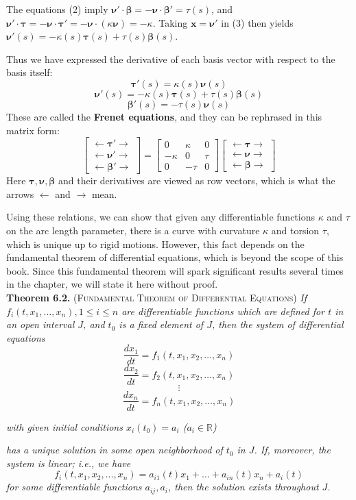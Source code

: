 \documentclass[leqno]{book}
\begin{document}
The equations (2) imply $\boldsymbol\nu'\cdot\boldsymbol\beta=-\boldsymbol\nu\cdot\boldsymbol\beta'=\tau(s)$, and $\boldsymbol\nu'\cdot\boldsymbol\tau=-\boldsymbol\nu\cdot\boldsymbol\tau'=-\boldsymbol\nu\cdot(\kappa\boldsymbol\nu)=-\kappa$.  Taking $\mathbf x=\boldsymbol\nu'$ in (3) then yields $\boldsymbol\nu'(s)=-\kappa(s)\boldsymbol\tau(s)+\tau(s)\boldsymbol\beta(s)$.

Thus we have expressed the derivative of each basis vector with respect to the basis itself:
$$\boldsymbol\tau'(s)=\kappa(s)\boldsymbol\nu(s)$$
$$\boldsymbol\nu'(s)=-\kappa(s)\boldsymbol\tau(s)+\tau(s)\boldsymbol\beta(s)$$
$$\boldsymbol\beta'(s)=-\tau(s)\boldsymbol\nu(s)$$
These are called the \textbf{Frenet equations}, and they can be rephrased in this matrix form:
$$\begin{bmatrix}\leftarrow\boldsymbol\tau'\rightarrow\\\leftarrow\boldsymbol\nu'\rightarrow\\\leftarrow\boldsymbol\beta'\rightarrow\end{bmatrix}=\begin{bmatrix}0&\kappa&0\\-\kappa&0&\tau\\0&-\tau&0\end{bmatrix}\begin{bmatrix}\leftarrow\boldsymbol\tau\rightarrow\\\leftarrow\boldsymbol\nu\rightarrow\\\leftarrow\boldsymbol\beta\rightarrow\end{bmatrix}$$
Here $\boldsymbol\tau,\boldsymbol\nu,\boldsymbol\beta$ and their derivatives are viewed as row vectors, which is what the arrows $\leftarrow$ and $\rightarrow$ mean.

Using these relations, we can show that given any differentiable functions $\kappa$ and $\tau$ on the arc length parameter, there is a curve with curvature $\kappa$ and torsion $\tau$, which is unique up to rigid motions.  However, this fact depends on the fundamental theorem of differential equations, which is beyond the scope of this book.  Since this fundamental theorem will spark significant results several times in the chapter, we will state it here without proof.\\

\noindent\textbf{Theorem 6.2.} \textsc{(Fundamental Theorem of Differential Equations)} \emph{If $f_i(t,x_1,\dots,x_n),1\leqslant i\leqslant n$ are differentiable functions which are defined for $t$ in an open interval $J$, and $t_0$ is a fixed element of $J$, then the system of differential equations}
$$\frac{dx_1}{dt}=f_1(t,x_1,x_2,\dots,x_n)$$
$$\frac{dx_2}{dt}=f_2(t,x_1,x_2,\dots,x_n)$$
$$\vdots$$
$$\frac{dx_n}{dt}=f_n(t,x_1,x_2,\dots,x_n)$$
\begin{center}
\emph{with given initial conditions $x_i(t_0)=a_i$ ($a_i\in\mathbb R$)}
\end{center}
\emph{has a unique solution in some open neighborhood of $t_0$ in $J$.  If, moreover, the system is linear; i.e., we have}
$$f_i(t,x_1,x_2,\dots,x_n)=a_{i1}(t)x_1+\dots+a_{in}(t)x_n+a_i(t)$$
\emph{for some differentiable functions $a_{ij},a_i$, then the solution exists throughout $J$.}\\
\end{document}
